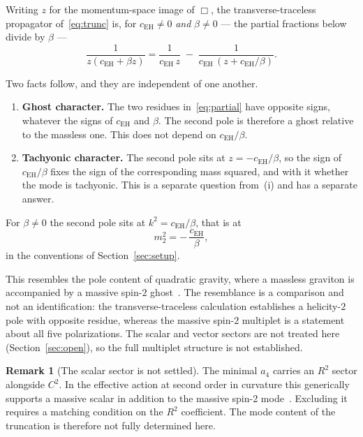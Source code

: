 \documentclass[12pt,a4paper]{article}
\theoremstyle{definition}
\newtheorem{remark}[theorem]{Remark}
\newcommand{\cEH}{c_{\mathrm{EH}}}
\begin{document}
    Writing $z$ for the momentum-space image of $\Box$, the transverse-traceless propagator of~\eqref{eq:trunc}
    is, for $\cEH \neq 0$ \emph{and} $\beta \neq 0$ --- the partial fractions below divide by $\beta$ ---
    \begin{equation}
      \frac{1}{z(\cEH + \beta z)}
      = \frac{1}{\cEH\,z} \;-\; \frac{1}{\cEH\,(z + \cEH/\beta)} .
      \label{eq:partial}
    \end{equation}

    Two facts follow, and they are independent of one another.

    \begin{enumerate}[label=\textup{(\roman*)}]
      \item \textbf{Ghost character.} The two residues in~\eqref{eq:partial} have opposite signs, whatever the
            signs of $\cEH$ and $\beta$. The second pole is therefore a ghost relative to the massless one. This
            does not depend on $\cEH/\beta$.
      \item \textbf{Tachyonic character.} The second pole sits at $z = -\cEH/\beta$, so the sign of $\cEH/\beta$
            fixes the sign of the corresponding mass squared, and with it whether the mode is tachyonic. This is a
            separate question from~(i) and has a separate answer.
    \end{enumerate}

    For $\beta \neq 0$ the second pole sits at $k^2 = \cEH/\beta$, that is at
    \begin{equation}
      m_2^2 = -\,\frac{\cEH}{\beta} ,
      \label{eq:mass}
    \end{equation}
    in the conventions of Section~\ref{sec:setup}.

    This resembles the pole content of quadratic gravity, where a massless graviton is accompanied by a massive
    spin-$2$ ghost~\cite{Stelle1977,Calmet2017}. The resemblance is a comparison and not an identification: the
    transverse-traceless calculation establishes a helicity-$2$ pole with opposite residue, whereas the massive
    spin-$2$ multiplet is a statement about all five polarizations. The scalar and vector sectors are not treated
    here (Section~\ref{sec:open}), so the full multiplet structure is not established.

    \begin{remark}[The scalar sector is not settled]
      \label{rem:scalar}
      The minimal $a_4$ carries an $R^2$ sector alongside $C^2$. In the effective action at second order in
      curvature this generically supports a massive scalar in addition to the massive spin-2
      mode~\cite{Calmet2017}. Excluding it requires a matching condition on the $R^2$ coefficient. The mode
      content of the truncation is therefore not fully determined here.
    \end{remark}
\end{document}
